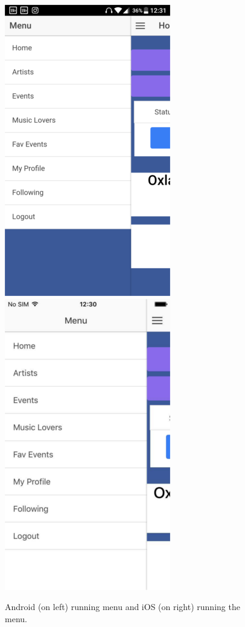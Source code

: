 \begin{center}
\begin{figure} [H]
\includegraphics[scale=0.45]{images/android}
\includegraphics[scale=0.45]{images/ios}
\caption{Android (on left) running menu and iOS (on right) running the menu.}
\end{figure}
\end{center}

